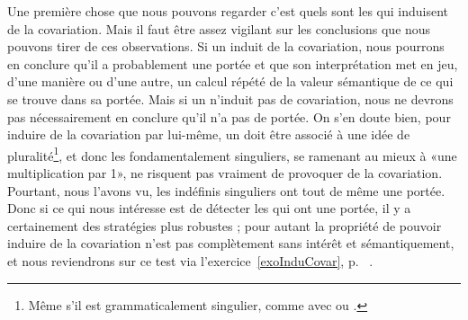 Une première chose que nous pouvons regarder c'est quels sont les
{\GN} qui induisent de la covariation. Mais il faut être assez
vigilant sur les conclusions que nous pouvons tirer de ces
observations. Si un {\GN} induit de la covariation, nous pourrons en
conclure qu'il a probablement une portée et que son interprétation met
en jeu, d'une manière ou d'une autre, un calcul répété de la valeur
sémantique de ce qui se trouve dans sa portée. Mais si un {\GN}
n'induit pas de covariation, nous ne devrons pas nécessairement en conclure qu'il n'a pas de portée. 
On s'en doute bien, pour induire de la covariation par lui-même, un {\GN} doit être associé à une idée de pluralité\footnote{Même s'il est grammaticalement singulier, comme avec  ou .}, et donc les {\GN} fondamentalement singuliers, se ramenant au mieux à «une multiplication par 1», ne risquent pas vraiment de provoquer de la covariation. Pourtant, nous l'avons vu, les indéfinis singuliers ont tout de même une portée.
Donc si ce qui nous intéresse est de détecter les {\GN} qui ont une portée, il y a certainement des stratégies plus robustes ; pour autant la propriété de pouvoir induire de la covariation n'est pas complètement sans intérêt et sémantiquement, et nous reviendrons sur ce test via l'exercice~\ref{exoInduCovar}, p.~\pageref{exoInduCovar} .

